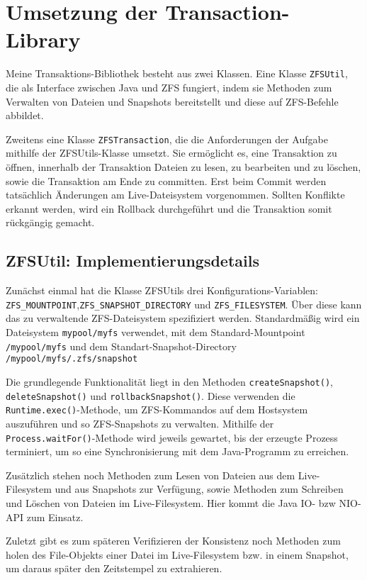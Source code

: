\documentclass[12pt]{article}
\begin{document}
\section*{Umsetzung der Transaction-Library}
Meine Transaktions-Bibliothek besteht aus zwei Klassen. 
Eine Klasse \texttt{ZFSUtil}, die als Interface zwischen Java und ZFS fungiert, indem sie Methoden zum Verwalten von Dateien und Snapshots bereitstellt und diese auf ZFS-Befehle abbildet.

Zweitens eine Klasse \texttt{ZFSTransaction}, die die Anforderungen der Aufgabe mithilfe der ZFSUtils-Klasse umsetzt.
Sie ermöglicht es, eine Transaktion zu öffnen, innerhalb der Transaktion Dateien zu lesen, zu bearbeiten und zu löschen, sowie die Transaktion am Ende zu committen.
Erst beim Commit werden tatsächlich Änderungen am Live-Dateisystem vorgenommen. 
Sollten Konflikte erkannt werden, wird ein Rollback durchgeführt und die Transaktion somit rückgängig gemacht.

\subsection*{ZFSUtil: Implementierungsdetails}
Zunächst einmal hat die Klasse ZFSUtils drei Konfigurations-Variablen: \texttt{ZFS\_MOUNTPOINT},\linebreak \texttt{ZFS\_SNAPSHOT\_DIRECTORY} und \texttt{ZFS\_FILESYSTEM}.
Über diese kann das zu verwaltende ZFS-Dateisystem spezifiziert werden.
Standardmäßig wird ein Dateisystem \texttt{mypool/myfs} verwendet, mit dem Standard-Mountpoint \texttt{/mypool/myfs} und dem Standart-Snapshot-Directory \linebreak \texttt{/mypool/myfs/.zfs/snapshot}

Die grundlegende Funktionalität liegt in den Methoden \texttt{createSnapshot()}, \texttt{deleteSnapshot()} und \texttt{rollbackSnapshot()}.
Diese verwenden die \texttt{Runtime.exec()}-Methode, um ZFS-Kommandos auf dem Hostsystem auszuführen und so ZFS-Snapshots zu verwalten.
Mithilfe der \texttt{Process.waitFor()}-Methode wird jeweils gewartet, bis der erzeugte Prozess terminiert, um so eine Synchronisierung mit dem Java-Programm zu erreichen.

Zusätzlich stehen noch Methoden zum Lesen von Dateien aus dem Live-Filesystem und aus Snapshots zur Verfügung, sowie Methoden zum Schreiben und Löschen von Dateien im Live-Filesystem.
Hier kommt die Java IO- bzw NIO-API zum Einsatz.

Zuletzt gibt es zum späteren Verifizieren der Konsistenz noch Methoden zum holen des File-Objekts einer Datei im Live-Filesystem bzw. in einem Snapshot, um daraus später den Zeitstempel zu extrahieren.
\end{document}
